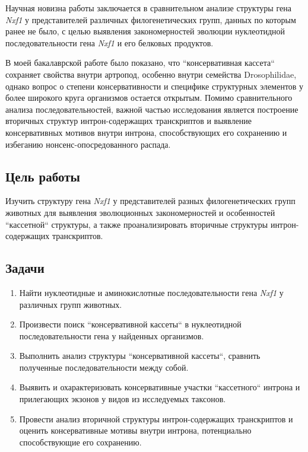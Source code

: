 Научная новизна работы заключается в сравнительном анализе структуры гена \textit{Nxf1} у представителей различных филогенетических групп, данных по которым ранее не было, с целью выявления закономерностей эволюции нуклеотидной последовательности гена \textit{Nxf1} и его белковых продуктов.

В моей бакалаврской работе было показано, что ``консервативная кассета`` сохраняет свойства внутри артропод, особенно внутри семейства Drosophilidae, однако вопрос о степени консервативности и специфике структурных элементов у более широкого круга организмов остается открытым.
Помимо сравнительного анализа последовательностей, важной частью исследования является построение вторичных структур интрон-содержащих транскриптов и выявление консервативных мотивов внутри интрона, способствующих его сохранению и избеганию нонсенс-опосредованного распада.


\subsection{Цель работы}

Изучить структуру гена \textit{Nxf1} у представителей разных филогенетических групп животных для выявления эволюционных закономерностей и особенностей ``кассетной`` структуры, а также проанализировать вторичные структуры интрон-содержа\-щих транскриптов.


\subsection{Задачи}

\begin{enumerate}[left=\parindent]
  \item Найти нуклеотидные и аминокислотные последовательности гена \textit{Nxf1} у различных групп животных.
  \item Произвести поиск ``консервативной кассеты`` в нуклеотидной последовательности гена у найденных организмов.
  \item Выполнить анализ структуры ``консервативной кассеты``, сравнить полученные последовательности между собой.
  \item Выявить и охарактеризовать консервативные участки ``кассетного`` интрона и прилегающих экзонов у видов из исследуемых таксонов.
  \item Провести анализ вторичной структуры интрон-содержащих транскриптов и оценить консервативные мотивы внутри интрона, потенциально способствующие его сохранению.
\end{enumerate}
